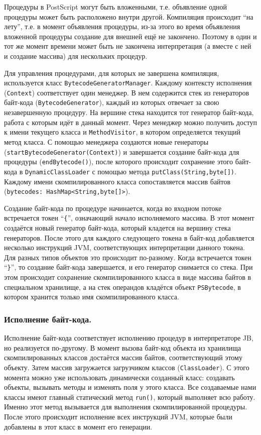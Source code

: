 	Процедуры в PostScript могут быть вложенными, т.е. объявление одной процедуры может быть расположено внутри другой. Компиляция происходит ``на лету'', т.е. в момент объявления процедуры, из-за этого во время объявления вложенной процедуры создание для внешней ещё не закончено. Поэтому в один и тот же момент времени может быть не закончена интерпретация (а вместе с ней и создание массива) для нескольких процедур.
	
	Для управления процедурами, для которых не завершена компиляция, используется класс \texttt{BytecodeGeneratorManager}. Каждому контексту исполнения (\texttt{Context}) соответствует один менеджер. В нем содержится стек из генераторов байт-кода (\texttt{BytecodeGenerator}), каждый из которых отвечает за свою незавершенную процедуру. На вершине стека находится тот генератор байт-кода, работа с которым идёт в данный момент. Через менеджер можно получить доступ к имени текущего класса и \texttt{MethodVisitor}, в котором определяется текущий метод класса. С помощью менеджера создаются новые генераторы (\texttt{startBytecodeGenerator(Context)}) и завершается создание  байт-кода для процедуры (\texttt{endBytecode()}), после которого происходит сохранение этого байт-кода в \texttt{DynamicClassLoader} с помощью метода \texttt{putClass(String,byte[])}. Каждому имени скомпилированного класса сопоставляется массив байтов (\texttt{bytecodes: HashMap<String,byte[]>}).
	
	Создание байт-кода по процедуре начинается, когда во входном потоке встречается токен ``\texttt{\{}'', означающий начало исполняемого массива. В этот момент создаётся новый генератор байт-кода, который кладется на вершину стека генераторов. После этого для каждого следующего токена в байт-код добавляется несколько инструкций JVM, соответствующих интерпретации данного токена. Для разных типов объектов это происходит по-разному. Когда встречается токен ``\texttt{\}}'', то создание байт-кода завершается, и его генератор снимается со стека. При этом происходит сохранение скомпилированного класса в виде массива байтов в специальном хранилище, а на стек операндов кладётся объект \texttt{PSBytecode}, в котором хранится только имя скомпилированного класса. 
	\subsubsection*{Исполнение байт-кода.}
	Исполнение байт-кода соответствует исполнению процедур в интерпретаторе JB, но реализуется по-другому. В момент вызова байт-код объекта из хранилища скомпилированных классов достаётся массив байтов, соответствующий этому объекту. Затем массив загружается загрузчиком классов (\texttt{ClassLoader}). С этого момента можно уже использовать динамически созданный класс: создавать объекты, вызывать методы и изменять поля у этого класса. Все создаваемые нами классы имеют главный статический метод \texttt{run()}, который выполняет всю работу. Именно этот метод вызывается для выполнения скомпилированной процедуры. После этого происходит исполнение всех инструкций JVM, которые были добавлены в этот класс в момент его генерации.
	
